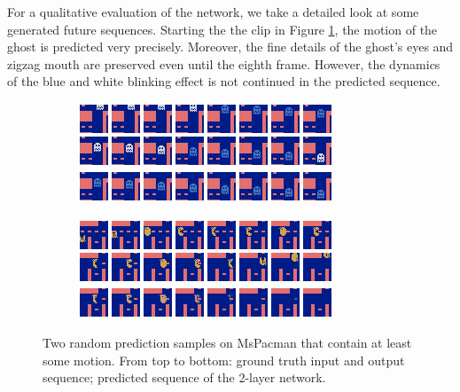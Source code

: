 For a qualitative evaluation of the network, we take a detailed look at some generated future sequences. Starting the the clip in Figure \ref{fig:pac-pred-random1}, the motion of the ghost is predicted very precisely. Moreover, the fine details of the ghost's eyes and zigzag mouth are preserved even until the eighth frame. However, the dynamics of the blue and white blinking effect is not continued in the predicted sequence.

\begin{figure}[h!tb]
\centering
\begin{subfigure}{0.49\textwidth}
  \centering
  \includegraphics[width=0.92\linewidth]{figures/pred/pac/random/pred-00.png}
  \caption{}
  \label{fig:pac-pred-random1}
\end{subfigure}%
\begin{subfigure}{0.49\textwidth}
  \centering
  \includegraphics[width=0.92\linewidth]{figures/pred/pac/random/pred-04.png}
  \caption{}
  \label{fig:pac-pred-random2}
\end{subfigure}
\caption[Random Prediction Samples on MsPacman]{Two random prediction samples on MsPacman that contain at least some motion. From top to bottom: ground truth input and output sequence; predicted sequence of the 2-layer network.} \label{fig:pac-pred-random}
\end{figure}

